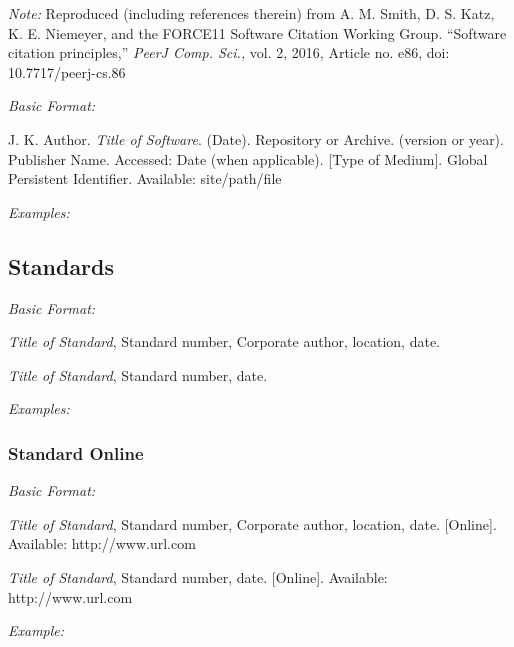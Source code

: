 \documentclass[10pt]{article}
\newcommand*{\guidelabel}[1]{\par\vspace{-4pt}\hspace*{22pt}\textit{#1}\par\vspace{-\parskip}}
\begin{document}
\textit{Note:} Reproduced (including references therein) from A. M. Smith, D. S. Katz, K. E. Niemeyer, and the FORCE11 Software Citation Working Group. “Software citation principles,” \textit{PeerJ Comp. Sci.,} vol. 2, 2016, Article no. e86, doi: 10.7717/peerj-cs.86

\guidelabel{Basic Format:}
\begin{guideitems}
  \item J. K. Author. \textit{Title of Software}. (Date). Repository or Archive. (version or year). Publisher Name. Accessed: Date (when applicable). [Type of Medium]. Global Persistent Identifier. Available: site/path/file
\end{guideitems}
\guidelabel{Examples:}
\begin{guideitems}
  \item {}
  \item {}
  \item {}
\end{guideitems}

\subsection{Standards}
\guidelabel{Basic Format:}
\begin{guideitems}
  \item \textit{Title of Standard}, Standard number, Corporate author, location, date.
  \item \textit{Title of Standard}, Standard number, date.
\end{guideitems}
\guidelabel{Examples:}
\begin{guideitems}
  \item {}
  \item {}
  \item {}
\end{guideitems}

\subsubsection{Standard Online}
\guidelabel{Basic Format:}
\begin{guideitems}
  \item \textit{Title of Standard}, Standard number, Corporate author, location, date. [Online]. Available: http://www.url.com
  \item \textit{Title of Standard}, Standard number, date. [Online]. Available: http://www.url.com
\end{guideitems}
\guidelabel{Example:}
\begin{guideitems}
  \item {}
\end{guideitems}
\end{document}
